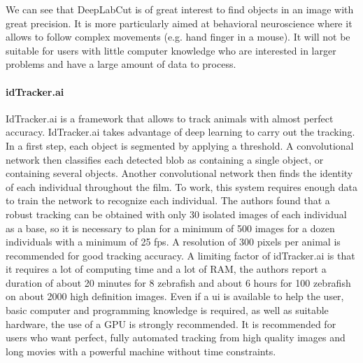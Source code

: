     We can see that DeepLabCut is of great interest to find objects in an image with great precision. It is more particularly aimed at behavioral neuroscience where it allows to follow complex movements (e.g. hand finger in a mouse). It will not be suitable for users with little computer knowledge who are interested in larger problems and have a large amount of data to process.
    \paragraph{idTracker.ai}
    IdTracker.ai \cite{romero2019idtracker} is a framework that allows to track animals with almost perfect accuracy. IdTracker.ai takes advantage of deep learning to carry out the tracking. In a first step, each object is segmented by applying a threshold. A convolutional network then classifies each detected blob as containing a single object, or containing several objects. Another convolutional network then finds the identity of each individual throughout the film. To work, this system requires enough data to train the network to recognize each individual. The authors found that a robust tracking can be obtained with only 30 isolated images of each individual as a base, so it is necessary to plan for a minimum of 500 images for a dozen individuals with a minimum of 25 fps. A resolution of 300 pixels per animal is recommended for good tracking accuracy. A limiting factor of idTracker.ai is that it requires a lot of computing time and a lot of RAM, the authors report a duration of about 20 minutes for 8 zebrafish and about 6 hours for 100 zebrafish on about 2000 high definition images. Even if a ui is available to help the user, basic computer and programming knowledge is required, as well as suitable hardware, the use of a GPU is strongly recommended. It is recommended for users who want perfect, fully automated tracking from high quality images and long movies with a powerful machine without time constraints.


